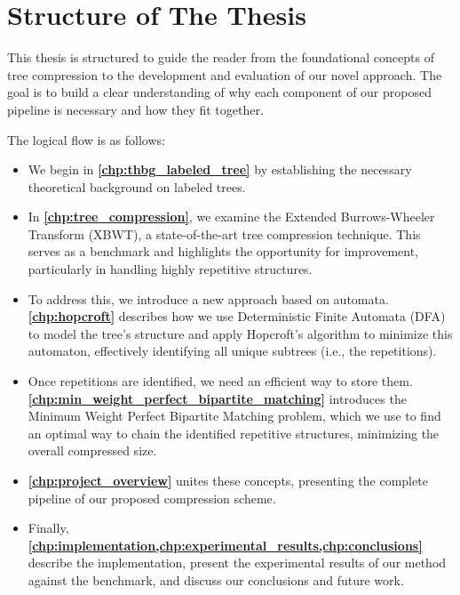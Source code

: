 \section{Structure of The Thesis}
This thesis is structured to guide the reader from the foundational concepts of tree compression to the development and evaluation of our novel approach. The goal is to build a clear understanding of why each component of our proposed pipeline is necessary and how they fit together.

The logical flow is as follows:
\begin{itemize}
    \item We begin in \textbf{\cref{chp:thbg_labeled_tree}} by establishing the necessary theoretical background on labeled trees.
    \item In \textbf{\cref{chp:tree_compression}}, we examine the Extended Burrows-Wheeler Transform (XBWT), a state-of-the-art tree compression technique. This serves as a benchmark and highlights the opportunity for improvement, particularly in handling highly repetitive structures.
    \item To address this, we introduce a new approach based on automata. \textbf{\cref{chp:hopcroft}} describes how we use Deterministic Finite Automata (DFA) to model the tree's structure and apply Hopcroft's algorithm to minimize this automaton, effectively identifying all unique subtrees (i.e., the repetitions).
    \item Once repetitions are identified, we need an efficient way to store them. \textbf{\cref{chp:min_weight_perfect_bipartite_matching}} introduces the Minimum Weight Perfect Bipartite Matching problem, which we use to find an optimal way to chain the identified repetitive structures, minimizing the overall compressed size.
    \item \textbf{\cref{chp:project_overview}} unites these concepts, presenting the complete pipeline of our proposed compression scheme.
    \item Finally, \textbf{\cref{chp:implementation,chp:experimental_results,chp:conclusions}} describe the implementation, present the experimental results of our method against the benchmark, and discuss our conclusions and future work.
\end{itemize}
